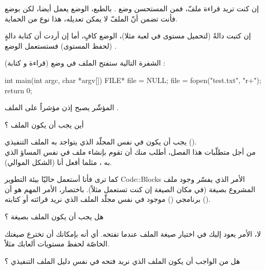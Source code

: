 \begin{information}
  إن كنت تريد قراءة ملفّ، فمن المستحسن وضع
.
بالطبع، الوضع
يعمل أيضا، لكن بوضع
فأنت تضمن أنّ الملفّ لا يمكن تعديله، هذا نوع من الحماية.
\end{information}

إن كتبت دالةً
(لتحميل مستوى في لعبة مثلا)، الوضع
كافٍ، أما إن أردت أن كتابة دالةٍ
(لحفظ المستوى) فستستعمل الوضع
.

الشفرة التالية ستفتح الملف
في وضع
(قراءة و كتابة) :

\begin{Csource}
int main(int argc, char *argv[])
{
	FILE* file = NULL;
	file = fopen("test.txt", "r+");
	return 0;
}
\end{Csource}

المؤشّر
يصبح إذن مؤشراً على الملف
.

\begin{question}
  أين يجب أن يكون الملف
؟
\end{question}

يجب أن يكون في نفس المجلّد الذي يتواجد به الملف التنفيذي
().\\
من أجل متطلّبات هذا الفصل، أطلب منك أن تقوم بإنشاء ملف
في نفس المساؤ الذي به
،
مثلما أفعل أنا (الشكل الموالي).


كما ترى فأنا أستعمل  حاليّا بيئة التطوير
\textenglish{Code::Blocks}
الأمر الذي يفسّر وجود ملف المشروع بصيغة
(في مكان الصيغة
إن كنت تستعمل
مثلاً). باختصار، الأمر المهم هو أن برنامجي
()
موجود في نفس مجلّد الملف الذي نريد قرائته أو كتابته
().

\begin{question}
  هل يجب أن يكون الملف بصيغة
 ؟
\end{question}

لا، الأمر يعود إليك في اختيار صيغة الملف عندما تفتحه. أي أنه بإمكانك أن تخترع صيغتك الخاصّة
لحفظ مستويات ألعابك مثلاً.

\begin{question}
  هل من الواجب أن يكون الملف الذي نريد فتحه في نفس دليل الملف التنفيذي ؟
\end{question}

